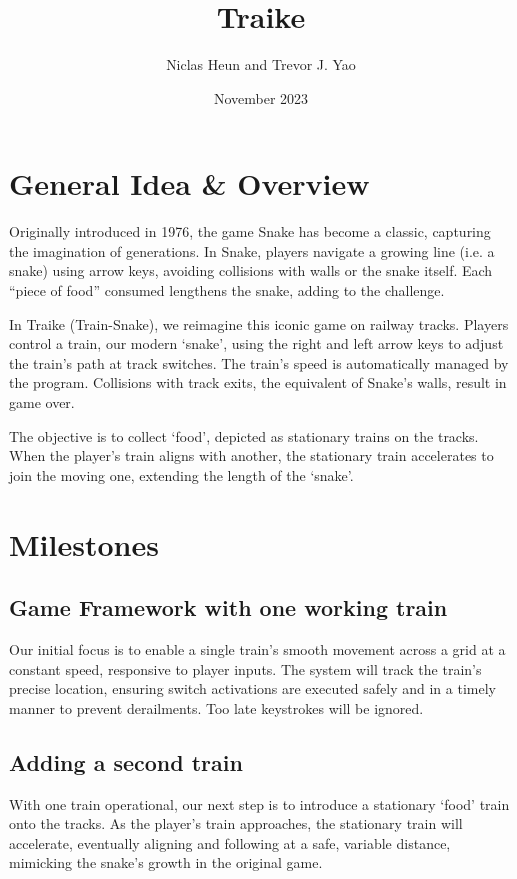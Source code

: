 \documentclass[10pt]{article}
\title{Traike}
\author{Niclas Heun and Trevor J. Yao}
\date{November 2023}
\begin{document}
\maketitle

\section{General Idea \& Overview}
Originally introduced in 1976, the game Snake has become a classic, capturing the imagination of generations. In Snake, players navigate a growing line (i.e. a snake) using arrow keys, avoiding collisions with walls or the snake itself. Each ``piece of food'' consumed lengthens the snake, adding to the challenge.

In Traike (Train-Snake), we reimagine this iconic game on railway tracks. Players control a train, our modern `snake', using the right and left arrow keys to adjust the train's path at track switches. The train's speed is automatically managed by the program. Collisions with track exits, the equivalent of Snake's walls, result in game over.

The objective is to collect `food', depicted as stationary trains on the tracks. When the player's train aligns with another, the stationary train accelerates to join the moving one, extending the length of the `snake'.

\section{Milestones}
\subsection{Game Framework with one working train}
Our initial focus is to enable a single train's smooth movement across a grid at a constant speed, responsive to player inputs. The system will track the train's precise location, ensuring switch activations are executed safely and in a timely manner to prevent derailments.
Too late keystrokes will be ignored.

\subsection{Adding a second train}
With one train operational, our next step is to introduce a stationary `food' train onto the tracks. As the player's train approaches, the stationary train will accelerate, eventually aligning and following at a safe, variable distance, mimicking the snake's growth in the original game.
\end{document}
